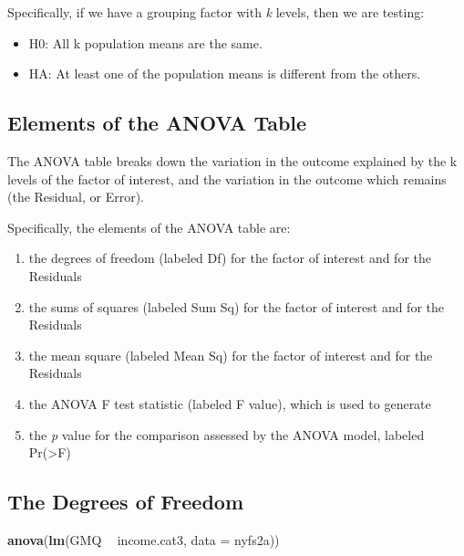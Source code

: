 \documentclass[
]{book}
\newenvironment{Shaded}{\begin{snugshade}}{\end{snugshade}}
\newcommand{\DataTypeTok}[1]{\textcolor[rgb]{0.13,0.29,0.53}{#1}}
\newcommand{\KeywordTok}[1]{\textcolor[rgb]{0.13,0.29,0.53}{\textbf{#1}}}
\newcommand{\NormalTok}[1]{#1}
\newcommand{\OperatorTok}[1]{\textcolor[rgb]{0.81,0.36,0.00}{\textbf{#1}}}
\newcommand{\StringTok}[1]{\textcolor[rgb]{0.31,0.60,0.02}{#1}}
\providecommand{\tightlist}{%
  \setlength{\itemsep}{0pt}\setlength{\parskip}{0pt}}
\begin{document}
Specifically, if we have a grouping factor with \emph{k} levels, then we are testing:

\begin{itemize}
\tightlist
\item
  H0: All k population means are the same.
\item
  HA: At least one of the population means is different from the others.
\end{itemize}

\hypertarget{elements-of-the-anova-table}{%
\subsection{Elements of the ANOVA Table}\label{elements-of-the-anova-table}}

The ANOVA table breaks down the variation in the outcome explained by the k levels of the factor of interest, and the variation in the outcome which remains (the Residual, or Error).

Specifically, the elements of the ANOVA table are:

\begin{enumerate}
\def\labelenumi{\arabic{enumi}.}
\tightlist
\item
  the degrees of freedom (labeled Df) for the factor of interest and for the Residuals
\item
  the sums of squares (labeled Sum Sq) for the factor of interest and for the Residuals
\item
  the mean square (labeled Mean Sq) for the factor of interest and for the Residuals
\item
  the ANOVA F test statistic (labeled F value), which is used to generate
\item
  the \emph{p} value for the comparison assessed by the ANOVA model, labeled Pr(\textgreater F)
\end{enumerate}

\hypertarget{the-degrees-of-freedom}{%
\subsection{The Degrees of Freedom}\label{the-degrees-of-freedom}}

\begin{Shaded}
\begin{Highlighting}[]
\KeywordTok{anova}\NormalTok{(}\KeywordTok{lm}\NormalTok{(GMQ }\OperatorTok{~}\StringTok{ }\NormalTok{income.cat3, }\DataTypeTok{data =}\NormalTok{ nyfs2a))}
\end{Highlighting}
\end{Shaded}
\end{document}
